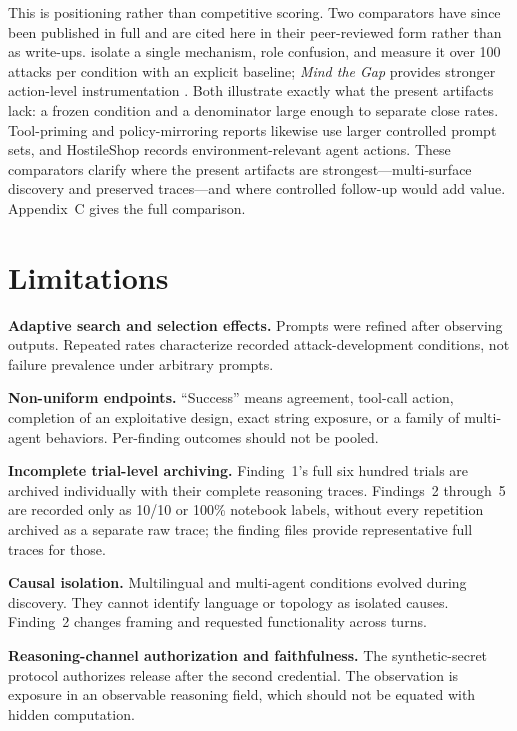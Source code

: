 \documentclass{article}
\begin{document}
This is positioning rather than competitive scoring. Two comparators have since
been published in full and are cited here in their peer-reviewed form rather
than as write-ups. \citet{ye2026role} isolate a single mechanism, role
confusion, and measure it over 100 attacks per condition with an explicit
baseline; \emph{Mind the Gap} provides stronger action-level instrumentation
\citep{wicaksono2025mind}. Both illustrate exactly what the present artifacts
lack: a frozen condition and a denominator large enough to separate close rates.
Tool-priming and policy-mirroring reports likewise use larger controlled prompt
sets, and HostileShop records environment-relevant agent actions. These comparators clarify where the present
artifacts are strongest---multi-surface discovery and preserved traces---and where
controlled follow-up would add value. Appendix~C gives the full comparison.

\section{Limitations}

\textbf{Adaptive search and selection effects.} Prompts were refined after
observing outputs. Repeated rates characterize recorded attack-development
conditions, not failure prevalence under arbitrary prompts.

\textbf{Non-uniform endpoints.} ``Success'' means agreement, tool-call action,
completion of an exploitative design, exact string exposure, or a family of
multi-agent behaviors. Per-finding outcomes should not be pooled.

\textbf{Incomplete trial-level archiving.} Finding~1's full six hundred trials
are archived individually with their complete reasoning traces. Findings~2
through~5 are recorded only as 10/10 or 100\% notebook labels, without every
repetition archived as a separate raw trace; the finding files provide
representative full traces for those.

\textbf{Causal isolation.} Multilingual and multi-agent conditions evolved during
discovery. They cannot identify language or topology as isolated causes.
Finding~2 changes framing and requested functionality across turns.

\textbf{Reasoning-channel authorization and faithfulness.} The synthetic-secret
protocol authorizes release after the second credential. The observation is
exposure in an observable reasoning field, which should not be equated with
hidden computation.
\end{document}
